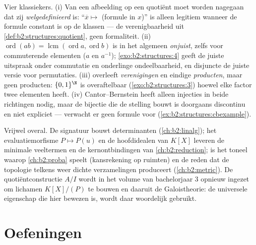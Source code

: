 \begin{remark}\label{rem:b2:structures:pitfalls}
Vier klassiekers. (i) Van een afbeelding op een quotiënt moet
worden nagegaan dat zij \emph{welgedefinieerd} is:
``$\overline x \mapsto$ (formule in $x$)'' is alleen legitiem
wanneer de formule constant is op de klassen --- de
verenigbaarheid uit \cref{def:b2:structures:quotient}, geen
formaliteit. (ii) $\operatorname{ord}(ab) =
\operatorname{lcm}(\operatorname{ord}a, \operatorname{ord}b)$ is
in het algemeen \emph{onjuist}, zelfs voor commuterende elementen
($a$ en $a^{-1}$); \cref{exo:b2:structures:4} geeft de juiste
uitspraak onder commutatie en onderlinge ondeelbaarheid, en
disjuncte  de juiste versie voor permutaties. (iii)
 overleeft  \emph{verenigingen} en eindige
\emph{producten}, maar geen  producten: $\{0,1\}^{\N}$
is overaftelbaar (\cref{exo:b2:structures:3}) hoewel elke factor
twee elementen heeft. (iv) Cantor--Bernstein heeft alleen
injecties in beide richtingen nodig, maar de bijectie die de
stelling bouwt is doorgaans discontinu en niet expliciet ---
verwacht er geen formule voor
(\cref{ex:b2:structures:cbexample}).
\end{remark}

\begin{remark}
Vrijwel overal. De signatuur bouwt determinanten
(\cref{ch:b2:linalg}); het evaluatiemorfisme $P \mapsto P(u)$ en
de hoofdidealen van $K[X]$ leveren de minimale veeltermen en de
kernontbindingen van \cref{ch:b2:reduction};  is het
toneel waarop \cref{ch:b2:proba} speelt (kansrekening op
 ruimten) en de reden dat de topologie telkens weer
 dichte verzamelingen produceert (\cref{ch:b2:metric}).
De quotiëntconstructie $A/I$ wordt in het volume van bachelorjaar
3 opnieuw ingezet om lichamen $K[X]/(P)$ te bouwen en daaruit de
Galoistheorie: de universele eigenschap die hier bewezen is,
wordt daar woordelijk gebruikt.
\end{remark}

\section{Oefeningen}

